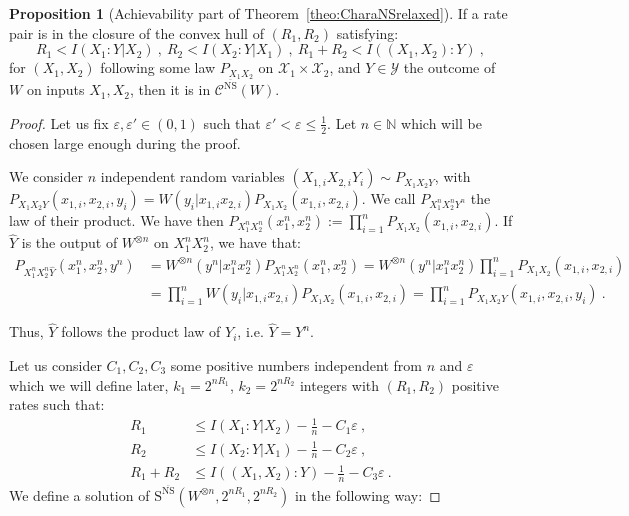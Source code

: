 \documentclass[11pt]{article}
\theoremstyle{definition}
\newtheorem{prop}[theo]{Proposition}
\theoremstyle{remark}
\begin{document}
  \begin{prop}[Achievability part of Theorem~\ref{theo:CharaNSrelaxed}]      
      \label{prop:AchievabilityNSrelaxed}
      If a rate pair is in the closure of the convex hull of $(R_1,R_2)$ satisfying:
      \[ R_1 < I(X_1:Y|X_2)\ ,\ R_2 < I(X_2:Y|X_1)\ ,\ R_1+R_2 < I((X_1,X_2):Y) \ ,\]
      for $(X_1,X_2)$ following some law $P_{X_1X_2}$ on $\mathcal{X}_1 \times \mathcal{X}_2$, and $Y \in \mathcal{Y}$ the outcome of $W$ on inputs $X_1,X_2$, then it is in $\mathcal{C}^{\overline{\mathrm{NS}}}(W)$.
  \end{prop}
  \begin{proof}
    Let us fix $\varepsilon,\varepsilon' \in (0,1)$ such that $\varepsilon' < \varepsilon \leq \frac{1}{2}$. Let $n \in \mathbb{N}$ which will be chosen large enough during the proof.

    We consider $n$ independent random variables $(X_{1,i}X_{2,i}Y_i) \sim P_{X_1X_2Y}$, with $P_{X_1X_2Y}(x_{1,i},x_{2,i},y_i) = W(y_i|x_{1,i}x_{2,i})P_{X_1X_2}(x_{1,i},x_{2,i})$. We call $P_{X_1^nX_2^nY^n} $ the law of their product. We have then $P_{X_1^nX_2^n}(x_1^n,x_2^n) := \prod_{i=1}^n P_{X_1X_2}(x_{1,i},x_{2,i})$. If $\hat{Y}$ is the output of $W^{\otimes n}$ on $X_1^nX_2^n$, we have that:
      \begin{equation}
        \begin{aligned}
          P_{X_1^nX_2^n\hat{Y}}(x_1^n,x_2^n,y^n) &= W^{\otimes n}(y^n|x_1^nx_2^n)P_{X_1^nX_2^n}(x_1^n,x_2^n) = W^{\otimes n}(y^n|x_1^nx_2^n)\prod_{i=1}^n P_{X_1X_2}(x_{1,i},x_{2,i})\\
          &= \prod_{i=1}^n W(y_i|x_{1,i}x_{2,i})P_{X_1X_2}(x_{1,i},x_{2,i}) = \prod_{i=1}^n P_{X_1X_2Y}(x_{1,i},x_{2,i},y_i) \ .
        \end{aligned}
      \end{equation}

      Thus, $\hat{Y}$ follows the product law of $Y_i$, i.e.  $\hat{Y} = Y^n$.
      
  Let us consider $C_1,C_2,C_3$ some positive numbers independent from $n$ and $\varepsilon$ which we will define later,  $k_1 = 2^{nR_1}$, $k_2 = 2^{nR_2}$ integers with $(R_1,R_2)$ positive rates such that:
  \begin{equation}
      \begin{aligned}
        R_1 &\leq I(X_1:Y|X_2) - \frac{1}{n} - C_1\varepsilon \ ,\\
        R_2 &\leq I(X_2:Y|X_1) - \frac{1}{n} - C_2\varepsilon \ ,\\
        R_1+R_2 &\leq I((X_1,X_2):Y) - \frac{1}{n} - C_3\varepsilon \ .
      \end{aligned}
    \end{equation}
  We define a solution of $\mathrm{S}^{\overline{\mathrm{NS}}}(W^{\otimes n},2^{nR_1},2^{nR_2})$ in the following way:
      

\end{proof}
\end{document}
